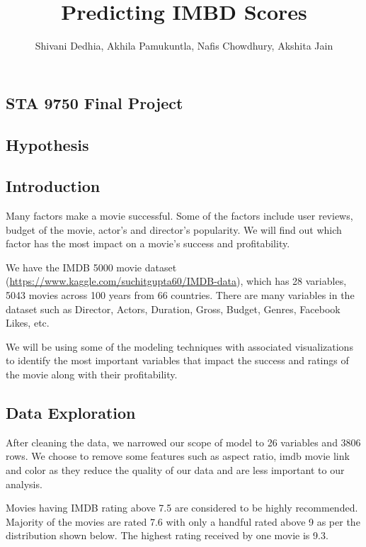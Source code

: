 \documentclass[
]{article}
\title{Predicting IMBD Scores}
\author{Shivani Dedhia, Akhila Pamukuntla, Nafis Chowdhury, Akshita Jain}
\date{}
\begin{document}
\maketitle

\hypertarget{sta-9750-final-project}{%
\subsection{STA 9750 Final Project}\label{sta-9750-final-project}}

\hypertarget{hypothesis}{%
\subsection{Hypothesis}\label{hypothesis}}

\hypertarget{introduction}{%
\subsection{Introduction}\label{introduction}}

Many factors make a movie successful. Some of the factors include user
reviews, budget of the movie, actor's and director's popularity. We will
find out which factor has the most impact on a movie's success and
profitability.

We have the IMDB 5000 movie dataset
(\url{https://www.kaggle.com/suchitgupta60/IMDB-data}), which has 28
variables, 5043 movies across 100 years from 66 countries. There are
many variables in the dataset such as Director, Actors, Duration, Gross,
Budget, Genres, Facebook Likes, etc.

We will be using some of the modeling techniques with associated
visualizations to identify the most important variables that impact the
success and ratings of the movie along with their profitability.

\hypertarget{data-exploration}{%
\subsection{Data Exploration}\label{data-exploration}}

After cleaning the data, we narrowed our scope of model to 26 variables
and 3806 rows. We choose to remove some features such as aspect ratio,
imdb movie link and color as they reduce the quality of our data and are
less important to our analysis.

Movies having IMDB rating above 7.5 are considered to be highly
recommended. Majority of the movies are rated 7.6 with only a handful
rated above 9 as per the distribution shown below. The highest rating
received by one movie is 9.3.
\end{document}
